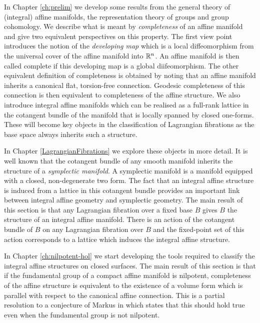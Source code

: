 In Chapter \ref{ch:prelim} we develop some results from the general theory of
(integral) affine manifolds, the representation theory of groups and group
cohomology. We describe what is meant by \emph{completeness} of an affine
manifold and give two equivalent perspectives on this property. The first view
point introduces the notion of the \emph{developing map} which is a local
diffeomorphism from the universal cover of the affine manifold into $\mathbb{R}^n$. An
affine manifold is then called complete if this developing map is a global
diifeomorphism. The other equivalent definition of completeness is obtained by
noting that an affine manifold inherits a canonical flat, torsion-free
connection. Geodesic completeness of this connection is then equivalent to
completeness of the affine structure. We also introduce integral affine
manifolds which can be realised as a full-rank lattice in the cotangent bundle
of the manifold that is locally spanned by closed one-forms. These will become
key objects in the classification of Lagrangian fibrations as the base space
always inherits such a structure.

In Chapter \ref{LagrangianFibrations} we explore these objects in more detail.
It is well known that the cotangent bundle of any smooth manifold inherits the
structure of a \emph{symplectic manifold}. A symplectic manifold is a manifold
equipped with a closed, non-degenerate two form. The fact that an integral
affine structure is induced from a lattice in this cotangent bundle provides an
important link between integral affine geometry and symplectic geometry. The
main result of this section is that any Lagrangian fibration over a fixed base
$B$ gives $B$ the structure of an integral affine manifold. There is an action
of the cotangent bundle of $B$ on any Lagrangian fibration over $B$ and the
fixed-point set of this action corresponds to a lattice which induces the
integral affine structure.

In Chapter \ref{ch:nilpotent-hol} we start developing the tools required to
classify the integral affine structures on closed surfaces. The main result of
this section is that if the fundamental group of a compact affine manifold is
nilpotent, completeness of the affine structure is equivalent to the existence
of a volume form which is parallel with respect to the canonical affine
connection. This is a partial resolution to a conjecture of Markus in
\cite{markus1963cosmological} which states that this should hold true even when
the fundamental group is not nilpotent.

